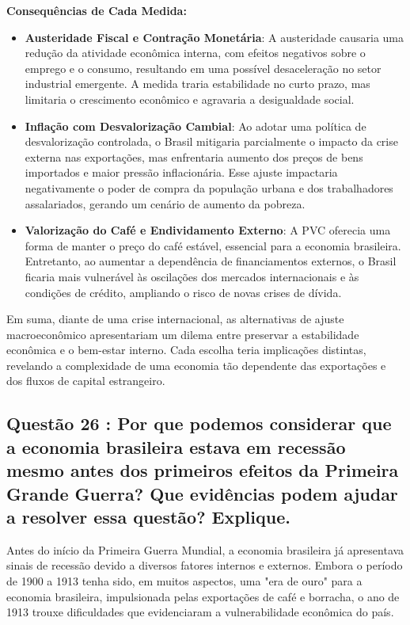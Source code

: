 \documentclass[a4paper,12pt]{article}[abntex2]
\begin{document}
\textbf{Consequências de Cada Medida:}
\begin{itemize}
    \item \textbf{Austeridade Fiscal e Contração Monetária}: A austeridade causaria uma redução da atividade econômica interna, com efeitos negativos sobre o emprego e o consumo, resultando em uma possível desaceleração no setor industrial emergente. A medida traria estabilidade no curto prazo, mas limitaria o crescimento econômico e agravaria a desigualdade social.

    \item \textbf{Inflação com Desvalorização Cambial}: Ao adotar uma política de desvalorização controlada, o Brasil mitigaria parcialmente o impacto da crise externa nas exportações, mas enfrentaria aumento dos preços de bens importados e maior pressão inflacionária. Esse ajuste impactaria negativamente o poder de compra da população urbana e dos trabalhadores assalariados, gerando um cenário de aumento da pobreza.

    \item \textbf{Valorização do Café e Endividamento Externo}: A PVC oferecia uma forma de manter o preço do café estável, essencial para a economia brasileira. Entretanto, ao aumentar a dependência de financiamentos externos, o Brasil ficaria mais vulnerável às oscilações dos mercados internacionais e às condições de crédito, ampliando o risco de novas crises de dívida.
\end{itemize}

Em suma, diante de uma crise internacional, as alternativas de ajuste macroeconômico apresentariam um dilema entre preservar a estabilidade econômica e o bem-estar interno. Cada escolha teria implicações distintas, revelando a complexidade de uma economia tão dependente das exportações e dos fluxos de capital estrangeiro.

\subsection{\textbf{Questão 26 : Por que podemos considerar que a economia brasileira estava em recessão mesmo antes dos primeiros efeitos da Primeira Grande Guerra? Que evidências podem ajudar a resolver essa questão? Explique.}}

Antes do início da Primeira Guerra Mundial, a economia brasileira já apresentava sinais de recessão devido a diversos fatores internos e externos. Embora o período de 1900 a 1913 tenha sido, em muitos aspectos, uma "era de ouro" para a economia brasileira, impulsionada pelas exportações de café e borracha, o ano de 1913 trouxe dificuldades que evidenciaram a vulnerabilidade econômica do país.
\end{document}

